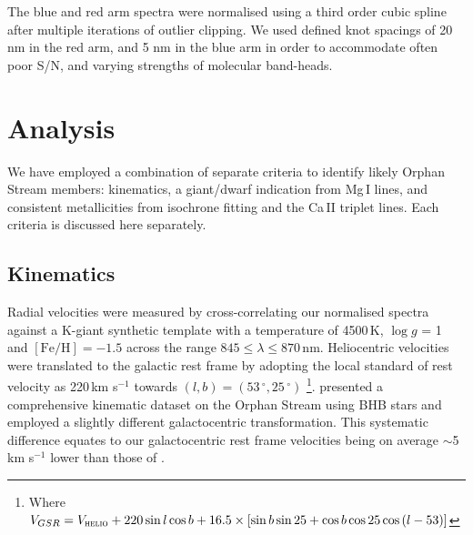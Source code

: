 \documentclass[10pt,apjl]{emulateapj}
\begin{document}
The blue and red arm spectra were normalised using a third order cubic spline after multiple iterations of outlier clipping. We used defined knot spacings of 20 nm in the red arm, and 5 nm in the blue arm in order to accommodate often poor S/N, and varying strengths of molecular band-heads.

\section{Analysis}
\label{sec:analysis}

We have employed a combination of separate criteria to identify likely Orphan Stream members: kinematics, a giant/dwarf indication from Mg\,\textsc{I} lines, and consistent metallicities from isochrone fitting and the Ca\,\textsc{II} triplet lines. Each criteria is discussed here separately.

\subsection{Kinematics}
Radial velocities were measured by cross-correlating our normalised spectra against a K-giant synthetic template with a temperature of 4500\,K, $\log{g}$ = 1 and $[\mbox{Fe/H}] = -1.5$ across the range $845 \leq \lambda \leq 870$\,nm. Heliocentric velocities were translated to the galactic rest frame by adopting the local standard of rest velocity as 220\,km s$^{-1}$ towards $(l, b) = (53\,^\circ, 25\,^\circ)$ \citep{Kerr_Lynden-Bell_1986, Mihalas_Binney_1981}\footnote{Where $V_{GSR} = V_{\textsc{helio}} + 220\sin{l}\cos{b} + 16.5\times[\sin{b}\sin{25} + \cos{b}\cos{25}\cos{(l - 53)}]$}. \citet{Newberg_et-al_2010} presented a comprehensive kinematic dataset on the Orphan Stream using BHB stars and employed a slightly different galactocentric transformation. This systematic difference equates to our galactocentric rest frame velocities being on average $\sim$5\,km s$^{-1}$ lower than those of \citet{Newberg_et-al_2010}.
\end{document}

